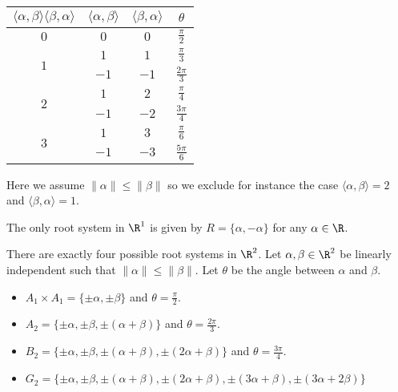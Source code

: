 \documentclass[a4paper]{article}
\begin{document}
\begin{table}[!h]
\centering
\begin{tabular}{|c|c|c|c|}
\hline
$\langle\alpha,\beta\rangle\langle\beta,\alpha\rangle$ & $\langle\alpha,\beta\rangle$ & $\langle\beta,\alpha\rangle$ & $\theta$         \\ \hline
$0$                                                    & $0$                          & $0$                          & $\frac{\pi}{2}$  \\[1.5ex] \hline
\multirow{2}{*}{$1$}                                   & $1$                          & $1$                          & $\frac{\pi}{3}$  \\[1.5ex] \cline{2-4} 
                                                       & $-1$                         & $-1$                         & $\frac{2\pi}{3}$ \\[1.5ex] \hline
\multirow{2}{*}{$2$}                                   & $1$                          & $2$                          & $\frac{\pi}{4}$  \\[1.5ex] \cline{2-4} 
                                                       & $-1$                         & $-2$                         & $\frac{3\pi}{4}$ \\[1.5ex] \hline
\multirow{2}{*}{$3$}                                   & $1$                          & $3$                          & $\frac{\pi}{6}$  \\[1.5ex] \cline{2-4} 
                                                       & $-1$                         & $-3$                         & $\frac{5\pi}{6}$ \\[1.5ex] \hline
\end{tabular}
\end{table}

Here we assume $\|\alpha\|\leq\|\beta\|$ so we exclude for instance the case $\langle\alpha,\beta\rangle=2$ and $\langle\beta,\alpha\rangle=1$. 

\begin{prp}{}{} The only root system in $\R^1$ is given by $R=\{\alpha,-\alpha\}$ for any $\alpha\in\R$. 
\end{prp}

\begin{prp}{}{} There are exactly four possible root systems in $\R^2$. Let $\alpha,\beta\in\R^2$ be linearly independent such that $\|\alpha\|\leq\|\beta\|$. Let $\theta$ be the angle between $\alpha$ and $\beta$. 
\begin{itemize}
\item $A_1\times A_1=\{\pm\alpha,\pm\beta\}$ and $\theta=\frac{\pi}{2}$. 
\item $A_2=\{\pm\alpha,\pm\beta,\pm(\alpha+\beta)\}$ and $\theta=\frac{2\pi}{3}$. 
\item $B_2=\{\pm\alpha,\pm\beta,\pm(\alpha+\beta),\pm(2\alpha+\beta)\}$ and $\theta=\frac{3\pi}{4}$. 
\item $G_2=\{\pm\alpha,\pm\beta,\pm(\alpha+\beta),\pm(2\alpha+\beta),\pm(3\alpha+\beta),\pm(3\alpha+2\beta)\}$
\end{itemize}
\end{prp}
\end{document}
